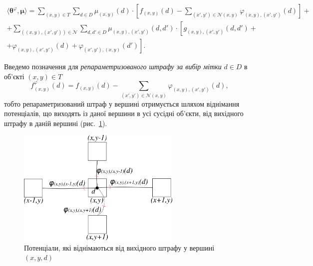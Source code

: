 \begin{equation} \label{eq:grouped:for:reparametrization}
\begin{gathered}
    \langle \pmb{\theta}^{\varphi}, \pmb{\mu} \rangle =
    \sum \limits_{\left(x, y \right) \in T}
        \sum \limits_{d \in D}
            \mu_{\left(x, y \right)} \left(d \right) \cdot \left[
                f_{\left(x, y \right)} \left(d \right) -
                \sum \limits_{\left(x', y' \right) \in \mathcal{N} \left(x, y \right)}
                    \varphi_{\left(x, y \right), \left(x', y' \right)} \left(
                        d
                    \right)
            \right] + \\
    + \sum \limits_{\left(\left(x, y \right), \left(x', y' \right)\right)\in \mathcal{N}}
        \sum \limits_{d, d' \in D}
             \mu_{\left(x, y \right), \left(x', y' \right)} \left(d, d' \right)
             \cdot \left[
                g_{\left(x, y \right), \left(x', y' \right)} \left(d, d' \right) + \right. \\
                + \left. \varphi_{\left(x, y \right), \left(x', y' \right)} \left(
                    d
                \right) +
                \varphi_{\left(x', y' \right), \left(x, y \right)} \left(
                    d'
                \right)
             \right].
\end{gathered}
\end{equation}

Введемо позначення для \textit{репараметризованого штрафу за вибір мітки}
$d \in D$ в об'єкті $\left(x, y \right) \in T$
\begin{equation} \label{eq:reparametrized:vertex}
    f_{\left(x, y \right)}^{\varphi} \left(d \right) =
    f_{\left(x, y \right)} \left(d \right) -
    \sum \limits_{\left(x', y' \right) \in \mathcal{N} \left(x, y \right)}
        \varphi_{\left(x, y \right), \left(x', y' \right)} \left(
            d
        \right),
\end{equation}
тобто репараметризований
штраф у вершині отримується шляхом віднімання потенціалів,
що виходять із даної вершини в усі сусідні об'єкти,
від вихідного штрафу в даній вершині (рис.~\ref{fig:reparametrized:vertex:weight}).

\begin{figure}[h]
  \centering
  \includegraphics[width=0.7\textwidth]{images/reparametrized_vertex_weight}
  \caption{Потенціали, які віднімаються від вихідного штрафу у вершині $\left(x, y, d \right)$}
  \label{fig:reparametrized:vertex:weight}
\end{figure}

